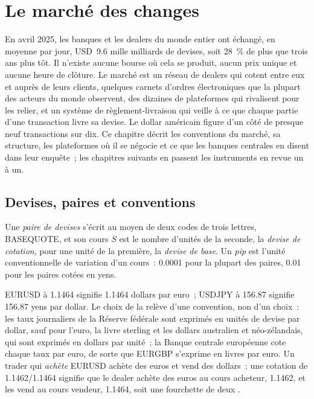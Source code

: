 \chapter{Le marché des changes}\label{ch:m2:the-fx-market}

En avril 2025, les banques et les dealers du monde entier ont échangé, en moyenne par jour, USD~9.6
mille milliards de devises, soit 28~\% de plus que trois ans plus tôt. Il n'existe
aucune bourse où cela se produit, aucun prix unique et aucune heure de clôture. Le
marché est un réseau de dealers qui cotent entre eux et auprès de leurs clients, quelques
carnets d'ordres électroniques que la plupart des acteurs du monde observent, des dizaines de plateformes
qui rivalisent pour les relier, et un système de règlement-livraison qui veille à ce que chaque partie
d'une transaction livre sa devise. Le dollar américain figure d'un côté de presque neuf
transactions sur dix. Ce chapitre décrit les conventions du marché, sa
structure, les plateformes où il se négocie et ce que les banques centrales en disent dans leur enquête~;
les chapitres suivants en passent les instruments en revue un à un.

\section{Devises, paires et conventions}

\begin{definition}\label{def:m2:the-fx-market:pair}
Une \emph{paire de devises} s'écrit au moyen de deux codes de trois lettres,
BASEQUOTE, et son cours $S$ est le nombre d'unités de la seconde, la
\emph{devise de cotation}, pour une unité de la première, la
\emph{devise de base}. Un \emph{pip} est
l'unité conventionnelle de variation d'un cours~: 0.0001 pour la plupart des paires, 0.01 pour les paires
cotées en yens.
\end{definition}

EURUSD à 1.1464 signifie 1.1464 dollars par euro~; USDJPY à 156.87 signifie 156.87
yens par dollar. Le choix de la  relève d'une convention, non d'un choix~:
les taux journaliers de la Réserve fédérale sont exprimés en unités de devise par dollar, sauf
pour l'euro, la livre sterling et les dollars australien et néo-zélandais, qui sont
exprimés en dollars par unité~; la Banque centrale européenne cote chaque taux par euro,
de sorte que EURGBP s'exprime en livres par euro. Un trader qui \emph{achète} EURUSD achète des euros et
vend des dollars~; une cotation de 1.1462/1.1464 signifie que le dealer achète des euros
au cours acheteur, 1.1462, et les vend au cours vendeur, 1.1464, soit une fourchette de deux .

